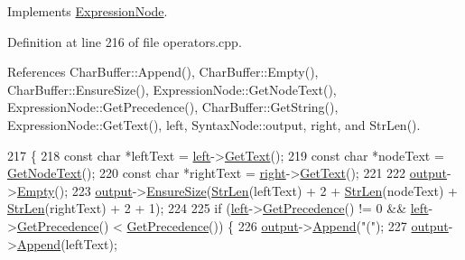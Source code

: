 Implements \hyperlink{classExpressionNode_a0bbf243108a14eaf963a8161ffd8eb92}{Expression\+Node}.



Definition at line 216 of file operators.\+cpp.



References Char\+Buffer\+::\+Append(), Char\+Buffer\+::\+Empty(), Char\+Buffer\+::\+Ensure\+Size(), Expression\+Node\+::\+Get\+Node\+Text(), Expression\+Node\+::\+Get\+Precedence(), Char\+Buffer\+::\+Get\+String(), Expression\+Node\+::\+Get\+Text(), left, Syntax\+Node\+::output, right, and Str\+Len().


\begin{DoxyCode}
217 \{
218     \textcolor{keyword}{const} \textcolor{keywordtype}{char} *leftText = \hyperlink{classNumericOperator_a55da3c4075408deff978711030fa8258}{left}->\hyperlink{classExpressionNode_a0bbf243108a14eaf963a8161ffd8eb92}{GetText}();
219     \textcolor{keyword}{const} \textcolor{keywordtype}{char} *nodeText = \hyperlink{classExpressionNode_a42a5e9562b0f645a19dcc83f698069b5}{GetNodeText}();
220     \textcolor{keyword}{const} \textcolor{keywordtype}{char} *rightText = \hyperlink{classNumericOperator_aa2c5b5bea59bbb068bc6013bc5cac483}{right}->\hyperlink{classExpressionNode_a0bbf243108a14eaf963a8161ffd8eb92}{GetText}();
221 
222     \hyperlink{classSyntaxNode_a1180628cbe3fce43930cee0df5a9ce5c}{output}->\hyperlink{classCharBuffer_abe39d3fd7d8b9c8ec343af2cae7adc96}{Empty}();
223     \hyperlink{classSyntaxNode_a1180628cbe3fce43930cee0df5a9ce5c}{output}->\hyperlink{classCharBuffer_ad1907009b5ad136692b989fa96bf2f7e}{EnsureSize}(\hyperlink{clib_8h_a67ec56eb98b49515d35005a5b3bf9a32}{StrLen}(leftText) + 2 + \hyperlink{clib_8h_a67ec56eb98b49515d35005a5b3bf9a32}{StrLen}(nodeText) + 
      \hyperlink{clib_8h_a67ec56eb98b49515d35005a5b3bf9a32}{StrLen}(rightText) + 2 + 1);
224 
225     \textcolor{keywordflow}{if} (\hyperlink{classNumericOperator_a55da3c4075408deff978711030fa8258}{left}->\hyperlink{classExpressionNode_a161b9ea0b79bbfc101d6f687c8481ddd}{GetPrecedence}() != 0 && \hyperlink{classNumericOperator_a55da3c4075408deff978711030fa8258}{left}->\hyperlink{classExpressionNode_a161b9ea0b79bbfc101d6f687c8481ddd}{GetPrecedence}() < 
      \hyperlink{classExpressionNode_a161b9ea0b79bbfc101d6f687c8481ddd}{GetPrecedence}()) \{
226         \hyperlink{classSyntaxNode_a1180628cbe3fce43930cee0df5a9ce5c}{output}->\hyperlink{classCharBuffer_a045b38735f7b3007c1b98d3d7b7feafe}{Append}(\textcolor{stringliteral}{"("});
227         \hyperlink{classSyntaxNode_a1180628cbe3fce43930cee0df5a9ce5c}{output}->\hyperlink{classCharBuffer_a045b38735f7b3007c1b98d3d7b7feafe}{Append}(leftText);

\end{DoxyCode}
